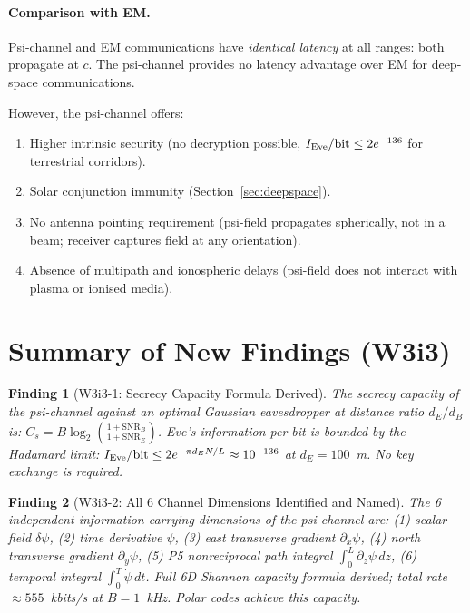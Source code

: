 \documentclass[aps,prd,twocolumn,superscriptaddress,nofootinbib]{revtex4-2}
\newcommand{\SNR}{\mathrm{SNR}}
\newtheorem{finding}{Finding}
\begin{document}
\paragraph{Comparison with EM.}
Psi-channel and EM communications have \emph{identical latency} at all
ranges: both propagate at $c$. The psi-channel provides no latency advantage
over EM for deep-space communications.

However, the psi-channel offers:
\begin{enumerate}
\item Higher intrinsic security (no decryption possible, $I_{\rm Eve}/\text{bit} \leq 2e^{-136}$
for terrestrial corridors).
\item Solar conjunction immunity (Section~\ref{sec:deepspace}).
\item No antenna pointing requirement (psi-field propagates
spherically, not in a beam; receiver captures field at any orientation).
\item Absence of multipath and ionospheric delays (psi-field does not
interact with plasma or ionised media).
\end{enumerate}

\section{Summary of New Findings (W3i3)}
\label{sec:findings}

\begin{finding}[W3i3-1: Secrecy Capacity Formula Derived]
The secrecy capacity of the psi-channel against an optimal Gaussian
eavesdropper at distance ratio $d_E/d_B$ is:
$C_s = B\log_2\left(\frac{1+\SNR_B}{1+\SNR_E}\right)$.
Eve's information per bit is bounded by the Hadamard limit:
$I_{\rm Eve}/\text{bit} \leq 2e^{-\pi d_E N/L} \approx 10^{-136}$
at $d_E = 100$~m. No key exchange is required.
\end{finding}

\begin{finding}[W3i3-2: All 6 Channel Dimensions Identified and Named]
The 6 independent information-carrying dimensions of the psi-channel are:
(1) scalar field $\delta\psi$,
(2) time derivative $\dot\psi$,
(3) east transverse gradient $\partial_x\psi$,
(4) north transverse gradient $\partial_y\psi$,
(5) P5 nonreciprocal path integral $\int_0^L \partial_z\psi\,dz$,
(6) temporal integral $\int_0^T\dot\psi\,dt$.
Full 6D Shannon capacity formula derived; total rate $\approx 555$~kbits/s
at $B = 1$~kHz. Polar codes achieve this capacity.
\end{finding}
\end{document}
